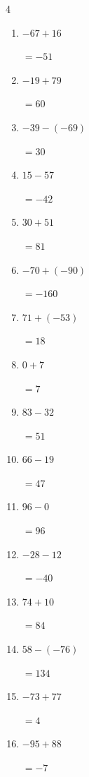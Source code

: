 \begin{multicols}{4}
\begin{enumerate}
        $=-70$

  \item $-67+16$

        $=-51$

  \item $-19+79$

        $=60$

  \item $-39-(-69)$

        $=30$

  \item $15-57$

        $=-42$

  \item $30+51$

        $=81$

  \item $-70+(-90)$

        $=-160$

  \item $71+(-53)$

        $=18$

  \item $0+7$

        $=7$

  \item $83-32$

        $=51$

  \item $66-19$

        $=47$

  \item $96-0$

        $=96$

  \item $-28-12$

        $=-40$

  \item $74+10$

        $=84$

  \item $58-(-76)$

        $=134$

\columnbreak %

\resetques

  \item $-73+77$

        $=4$

  \item $-95+88$

        $=-7$


\end{enumerate}
\end{multicols}
